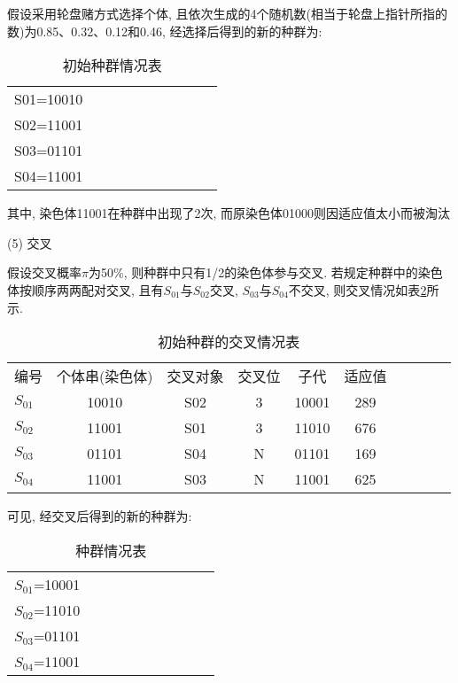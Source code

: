 假设采用轮盘赌方式选择个体, 且依次生成的4个随机数(相当于轮盘上指针所指的数)为0.85、0.32、0.12和0.46, 经选择后得到的新的种群为:
\begin{table} [H]
\caption{初始种群情况表}
\begin{center}
\begin{tabular} {lccccccccc}
\hline
    S01=10010\\
    S02=11001\\
    S03=01101\\
    S04=11001\\
\hline
\end{tabular}
\end{center}
\label{AI_table2019112803}
\end{table}
其中, 染色体11001在种群中出现了2次, 而原染色体01000则因适应值太小而被淘汰

(5) 交叉

假设交叉概率$\pi$为50\%, 则种群中只有1/2的染色体参与交叉. 若规定种群中的染色体按顺序两两配对交叉, 且有$S_{01}$与$S_{02}$交叉, $S_{03}$与$S_{04}$不交叉, 则交叉情况如表\ref{AI_table2019112804}所示.

\begin{table} [H]
\caption{初始种群的交叉情况表}
\begin{center}
\begin{tabular} {lccccccccc}
  \hline
编号&	个体串(染色体)&	交叉对象	&交叉位&	  子代	& 适应值\\
$S_{01}$	&10010&	S02&	3	&10001	&289\\
$S_{02}$	&11001&	S01&	3	&11010	&676\\
$S_{03}$	&01101&	S04&	N	&01101	&169\\
$S_{04}$	&11001&	S03&	N	&11001	&625\\
\hline
\end{tabular}
\end{center}
\label{AI_table2019112804}
\end{table}

可见, 经交叉后得到的新的种群为:
\begin{table} [H]
\caption{种群情况表}
\begin{center}
\begin{tabular} {lccccccccc}
\hline
    $S_{01}$=10001\\
    $S_{02}$=11010\\
    $S_{03}$=01101\\
    $S_{04}$=11001\\
\hline
\end{tabular}
\end{center}
\end{table}

